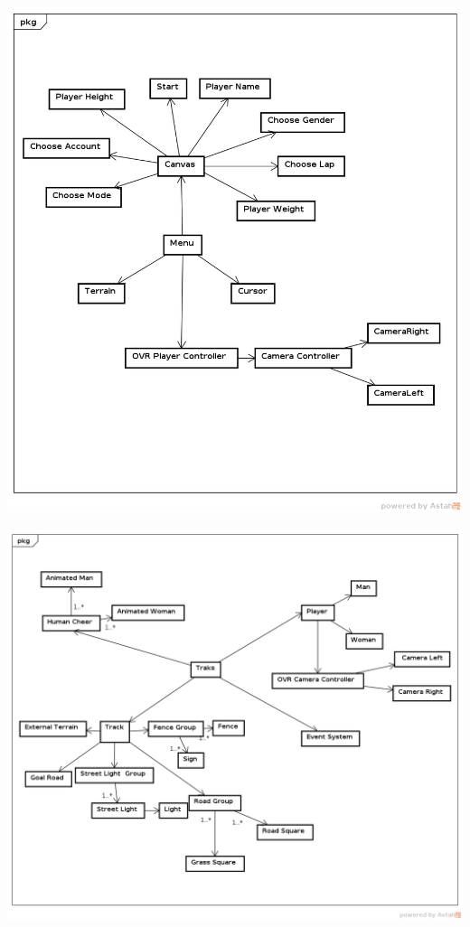 \begin{center}
	\includegraphics[scale=0.5]{figuras/menu_domain}
	\label{figura:menu_domain}
\end{center}

\begin{center}
	\includegraphics[scale=0.5]{figuras/main_domain}
	\label{figura:main_domain}
\end{center}


